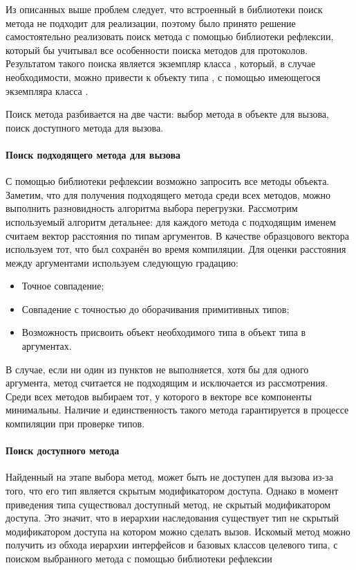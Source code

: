 Из описанных выше проблем следует, что встроенный в библиотеки поиск метода не подходит для реализации, поэтому было принято решение самостоятельно реализовать поиск метода с помощью библиотеки рефлексии, который бы учитывал все особенности поиска методов для протоколов. Результатом такого поиска является экземпляр класса , который, в случае необходимости, можно привести к объекту типа , с помощью имеющегося экземпляра класса .

Поиск метода разбивается на две части: выбор метода в объекте для вызова, поиск доступного метода для вызова.

\paragraph{Поиск подходящего метода для вызова}
С помощью библиотеки рефлексии возможно запросить все методы объекта. Заметим, что для получения подходящего метода среди всех методов, можно выполнить разновидность алгоритма выбора перегрузки. Рассмотрим используемый алгоритм детальнее: для каждого метода с подходящим именем считаем вектор расстояния по типам аргументов. В качестве образцового вектора используем тот, что был сохранён во время компиляции. Для оценки расстояния между аргументами используем следующую градацию:

\begin{itemize}
    \item Точное совпадение;
    \item Совпадение с точностью до оборачивания примитивных типов;
    \item Возможность присвоить объект необходимого типа в объект типа в аргументах.
\end{itemize}

В случае, если ни один из пунктов не выполняется, хотя бы для одного аргумента, метод считается не подходящим и исключается из рассмотрения. Среди всех методов выбираем тот, у которого в векторе все компоненты минимальны. Наличие и единственность такого метода гарантируется в процессе компиляции при проверке типов.

\paragraph{Поиск доступного метода}
Найденный на этапе выбора метод, может быть не доступен для вызова из-за того, что его тип является скрытым модификатором доступа. Однако в момент приведения типа существовал доступный метод, не скрытый модификатором доступа. Это значит, что в иерархии наследования существует тип не скрытый модификатором доступа на котором можно сделать вызов. Искомый метод можно получить из обхода иерархии интерфейсов и базовых классов целевого типа, с поиском выбранного метода с помощью библиотеки рефлексии

